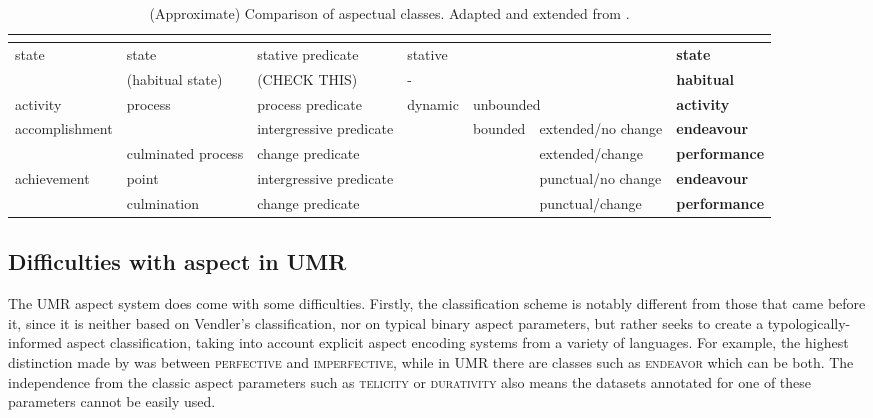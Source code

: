 \begin{table}[]
    \begin{adjustbox}{width=\textwidth}
    \begin{tabular}{|l|l|l|l|l|l|l|}
    \hline
    \citet*{vendler57} &  \citet*{moens-steedman-1988-temporal}& \citet*{egg2005flexible} & \multicolumn{3}{l}{\citet*{annotAndAutoClassOfAspectCat}}  \vline & \citet{umr} \\ \hline \hline
\multirow{2}{*}{state}         & state                      & stative predicate     & \multicolumn{3}{l}{stative} \vline & \textbf{state} \\ \cline{2-7}
                               & (habitual state)           & (CHECK THIS)          & \multicolumn{3}{l}{-} \vline & \textbf{habitual} \\ \hline
activity                       & \multirow{2}{*}{process}   & process predicate     & \multirow{5}{*}{dynamic} & \multicolumn{2}{l}{unbounded} \vline & \textbf{activity} \\ \cline{1-1}\cline{3-3}\cline{5-7}
\multirow{2}{*}{accomplishment}&                            & intergressive predicate&      & \multirow{4}{*}{bounded} &  extended/no change & \textbf{endeavour} \\ \cline{2-3}\cline{6-7}
                               & culminated process         & change predicate      &       &  & extended/change & \textbf{performance}\\ \cline{1-3}\cline{6-7}
\multirow{2}{*}{achievement}   & point                      & intergressive predicate&      &  & punctual/no change & \textbf{endeavour} \\ \cline{2-3} \cline{6-7}
                               & culmination                & change predicate      &       &  & punctual/change & \textbf{performance} \\ \hline

    \end{tabular}
    \end{adjustbox}
    \caption{(Approximate) Comparison of aspectual classes. Adapted and extended from \citet*{annotAndAutoClassOfAspectCat}.}
    \label{table:aspect_classes_comparison}
\end{table}

\subsection*{Difficulties with aspect in UMR}
The UMR aspect system does come with some difficulties. Firstly, the classification scheme is notably different from those that came before it, since it is neither based on Vendler's classification, nor on typical binary aspect parameters, but rather seeks to create a typologically-informed aspect classification, taking into account explicit aspect encoding systems from a variety of languages. For example, the highest distinction made by \citet{comrie1976aspect} was between \textsc{perfective} and \textsc{imperfective}, while in UMR there are classes such as \textsc{endeavor} which can be both. The independence from the classic aspect parameters such as \textsc{telicity} or \textsc{durativity} also means the datasets annotated for one of these parameters cannot be easily used.

